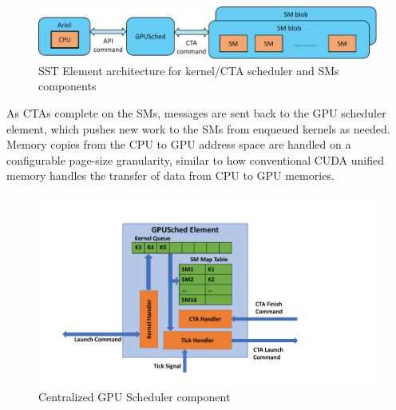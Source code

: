    \begin{figure}[!htb]
      \centering
      \setlength{\abovecaptionskip}{6pt plus 1pt minus 1pt}
      \includegraphics[width=.90\textwidth,keepaspectratio]{figures/2_1-eps-converted-to-crop.pdf}
      \captionsetup{width=.90\textwidth}
      \caption{SST Element architecture for kernel/CTA scheduler and SMs components}
      \label{fig:gpu_sched}
   \end{figure}


As CTAs complete on the SMs, messages are sent back to the GPU scheduler
element, which pushes new work to the SMs from enqueued kernels as needed.
Memory copies from the CPU to GPU address space are handled on a configurable
page-size granularity, similar to how conventional CUDA unified memory handles
the transfer of data from CPU to GPU memories.

   \begin{figure}[!htb]
      \centering
      \setlength{\abovecaptionskip}{6pt plus 1pt minus 1pt}
      \includegraphics[width=.90\textwidth,keepaspectratio]{figures/scheduler.pdf}
      \captionsetup{width=.75\textwidth}
      \caption{Centralized GPU Scheduler component}
      \label{fig:sched}
   \end{figure}

